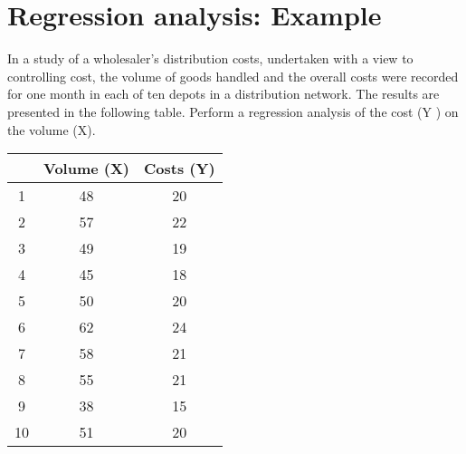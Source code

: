 \documentclass[]{report}
\begin{document}
\section{Regression analysis: Example}
In a study of a wholesaler’s distribution costs, undertaken with a view to controlling cost, the volume of goods handled and the overall costs were recorded for one month in each of ten depots in a distribution network. The results are presented in the following table. Perform a regression analysis of the cost (Y ) on the volume (X).



\begin{center}
	
	\begin{tabular}{|c|c|c|}\hline
		&  Volume (X)   &  Costs (Y) \\ \hline
		1     &     48     &   20 \\
		2     &    57      &   22 \\
		3     &    49      &   19 \\
		4     &    45      &   18 \\
		5     &    50      &   20 \\
		6     &    62      &   24 \\
		7     &    58      &   21 \\
		8     &    55      &   21 \\
		9     &    38      &   15 \\
		10    &    51      &  20 \\ \hline
	\end{tabular}
\end{center}











%
\end{document}
